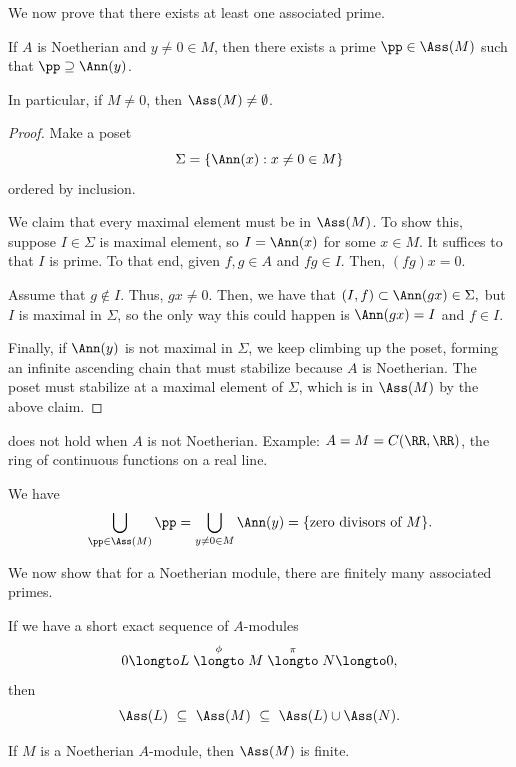 We now prove that there exists at least one associated prime.
\begin{theorem}[Existence]
    \label{thm:ass_exists}
    If $A$ is Noetherian and $y\neq 0\in M$, 
    then there exists a prime $\pp\in \Ass(M)$
    such that $\pp\supseteq \Ann(y)$.

    \noindent 
    In particular, if $M\neq 0$, then $\Ass(M)\neq\emptyset$.
\end{theorem}
\begin{proof}  
Make a poset
$$\Sigma = \{\Ann(x) : x\neq 0\in M\}$$
ordered by inclusion.

We claim that every maximal element must be in $\Ass(M)$.
To show this, suppose $I\in\Sigma$ is maximal element,
so $I=\Ann(x)$ for some $x\in M$. 
It suffices to that $I$ is prime.
To that end, given $f,g\in A$ and $fg\in I$.
Then, $(fg)x=0$. 

Assume that $g\notin I$. Thus, $gx\neq 0$.
Then, we have that
$(I,f)\subset \Ann(gx) \in\Sigma,$
but $I$ is maximal in $\Sigma$, 
so the only way this could happen is $\Ann(gx)=I$ and $f\in I$.

Finally, if $\Ann(y)$ is not maximal in $\Sigma$,
we keep climbing up the poset, forming an infinite
ascending chain that must stabilize because $A$ is Noetherian.
The poset must stabilize at a maximal element of $\Sigma$,
which is in $\Ass(M)$ by the above claim.
\end{proof}
\begin{remark}
     does not hold when $A$ is not Noetherian.
    Example: $A=M=C(\RR,\RR)$, the ring of continuous functions
    on a real line.
\end{remark}
\begin{corollary}
    \label{cor:union_ass}
    We have
    $$\bigcup_{\pp\in \Ass(M)} \pp = \bigcup_{y\neq 0\in M}
     \Ann(y) = \{\text{zero divisors of } M\}.$$
\end{corollary}
We now show that for a Noetherian module,
there are finitely many associated primes.
\begin{theorem}[Finiteness]
\label{thm:ass_is_finite}
\begin{alphenum}
    \item If we have a short exact sequence of $A$-modules
    $$0\longto L\stackrel\phi\longto M \stackrel\pi \longto N\longto 0,$$ 
    then
    $$\Ass(L)\ \subseteq\ \Ass(M)\ \subseteq\ \Ass(L)\cup \Ass(N).$$
    \item If $M$ is a Noetherian $A$-module,
    then $\Ass(M)$ is finite.
\end{alphenum}
\end{theorem}
